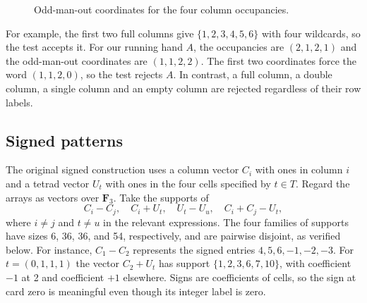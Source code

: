 \documentclass[12pt,letterpaper]{article}
\theoremstyle{definition}\newtheorem{example}[theorem]{Example}
\numberwithin{equation}{section}
\newcommand{\F}{\mathbf F}
\begin{document}
\begin{figure}[ht]
\centering
{}
\caption{Odd-man-out coordinates for the four column occupancies.}
\label{fig:odd}
\end{figure}

For example, the first two full columns give $\{1,2,3,4,5,6\}$ with four wildcards, so the test accepts it. For our running hand $A$, the occupancies are $(2,1,2,1)$ and the odd-man-out coordinates are $(1,1,2,2)$. The first two coordinates force the word $(1,1,2,0)$, so the test rejects $A$. In contrast, a full column, a double column, a single column and an empty column are rejected regardless of their row labels.

\subsection{Signed patterns}
The original signed construction \cite{CS99} uses a column vector $C_i$ with ones in column $i$ and a tetrad vector $U_t$ with ones in the four cells specified by $t\in T$. Regard the arrays as vectors over $\F_3$. Take the supports of
\[
C_i-C_j,\quad C_i+U_t,\quad U_t-U_u,\quad C_i+C_j-U_t,
\]
where $i\ne j$ and $t\ne u$ in the relevant expressions. The four families of supports have sizes 6, 36, 36, and 54, respectively, and are pairwise disjoint, as verified below. For instance, $C_1-C_2$ represents the signed entries $4,5,6,-1,-2,-3$. For $t=(0,1,1,1)$ the vector $C_2+U_t$ has support $\{1,2,3,6,7,10\}$, with coefficient $-1$ at 2 and coefficient $+1$ elsewhere. Signs are coefficients of cells, so the sign at card zero is meaningful even though its integer label is zero.
\end{document}

